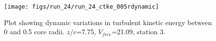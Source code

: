 \begin{figure}[H]
\centering
\texttt{[image: figs/run\_24/run\_24\_ctke\_005rdynamic]}
\caption{Plot showing dynamic variations in turbulent kinetic energy between 0 and 0.5 core radii. $z/c$=7.75, $V_{free}$=21.09, station 3.}
\label{fig:run_24_ctke_005rdynamic}
\end{figure}


